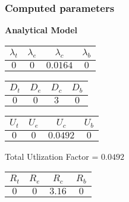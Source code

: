 \documentclass{article}
\begin{document}
\subsubsection{Computed parameters}
\begin{minipage}{0.5\textwidth}
\centering	\textbf{Analytical Model}
\begin{table}[H]
\centering
\begin{tabular}{@{}cccc@{}}
\toprule
$\lambda_t$ & $\lambda_e$ & $\lambda_c$ & $\lambda_b$\\
\midrule
$0$ & $0$ & $0.0164$ & $0$\\
\bottomrule
\end{tabular}
\end{table}\begin{table}[H]
\centering
\begin{tabular}{@{}cccc@{}}
\toprule
$D_t$ & $D_e$ & $D_c$ & $D_b$\\
\midrule
$0$ & $0$ & $3$ & $0$\\
\bottomrule
\end{tabular}
\end{table}\begin{table}[H]
\centering
\begin{tabular}{@{}cccc@{}}
\toprule
$U_t$ & $U_e$ & $U_c$ & $U_b$\\
\midrule
$0$ & $0$ & $0.0492$ & $0$\\
\bottomrule
\end{tabular}
\end{table}
\centering Total Utlization Factor = $0.0492$
\begin{table}[H]
\centering
\begin{tabular}{@{}cccc@{}}
\toprule
$R_t$ & $R_e$ & $R_c$ & $R_b$\\
\midrule
$0$ & $0$ & $3.16$ & $0$\\
\bottomrule
\end{tabular}
\end{table}
\end{minipage}
\end{document}
